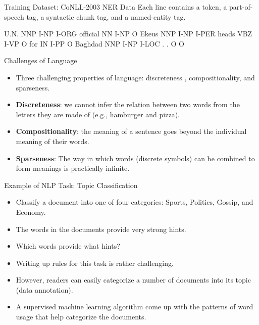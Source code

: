 \documentclass[handout]{beamer}
\begin{document}
\begin{frame}[fragile]{Training Dataset: CoNLL-2003 NER Data}
Each line contains a token, a part-of-speech tag, a syntactic chunk tag, and a named-entity tag.
\begin{center}
\begin{semiverbatim}
U.N.         NNP  I-NP  I-ORG 
official     NN   I-NP  O
Ekeus        NNP  I-NP  I-PER
heads        VBZ  I-VP  O
for          IN   I-PP  O
Baghdad      NNP  I-NP  I-LOC
.            .    O     O
\end{semiverbatim}
\end{center}


\end{frame}


\begin{frame}{Challenges of Language}
\begin{scriptsize}
\begin{itemize}
\item Three challenging properties of language: discreteness , compositionality, and sparseness.
\item \textbf{Discreteness}: we cannot infer the relation between two words from the letters they are made of (e.g., hamburger and pizza). 
\item \textbf{Compositionality}: the meaning of a sentence goes beyond the individual meaning of their words. 
\item \textbf{Sparseness}: The way in which words
(discrete symbols) can be combined to form meanings is practically infinite.
\end{itemize}
\end{scriptsize}
\end{frame}



\begin{frame}{Example of NLP Task: Topic Classification}
\begin{scriptsize}
\begin{itemize}
\item Classify a document into one of four categories: Sports, Politics, Gossip, and Economy. 
\item The words in the documents provide very strong hints.
\item Which words provide what hints? 
\item Writing up rules for this task is rather challenging. 
\item However, readers can easily categorize a number of documents into its topic (data annotation).
\item A supervised machine learning algorithm come up with the patterns of word usage that help categorize the documents.
\end{itemize}
\end{scriptsize}
\end{frame}
\end{document}

